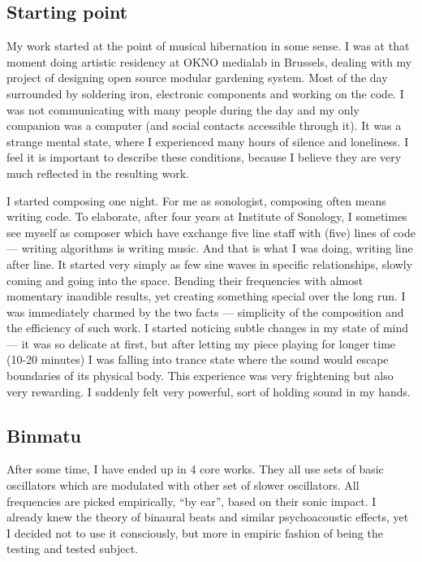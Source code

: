 \documentclass[12pt,a4paper,oneside]{report}
\begin{document}
\subsection{Starting point} My work started at the point of musical hibernation in some sense. I was at that moment doing artistic residency at OKNO medialab in Brussels, dealing with my project of designing open source modular gardening system. Most of the day surrounded by soldering iron, electronic components and working on the code. I was not communicating with many people during the day and my only companion was a computer (and social contacts accessible through it). It was a strange mental state, where I experienced many hours of silence and loneliness. I feel it is important to describe these conditions, because I believe they are very much reflected in the resulting work. 

I started composing one night. For me as sonologist, composing often means writing code. To elaborate, after four years at Institute of Sonology, I sometimes see myself as composer which have exchange five line staff with (five) lines of code --- writing algorithms is writing music. And that is what I was doing, writing line after line. It started very simply as few sine waves in specific relationships, slowly coming and going into the space. Bending their frequencies with almost momentary inaudible results, yet creating something special over the long run. I was immediately charmed by the two facts --- simplicity of the composition and the efficiency of such work. I started noticing subtle changes in my state of mind --- it was so delicate at first, but after letting my piece playing for longer time (10-20 minutes) I was falling into trance state where the sound would escape boundaries of its physical body. This experience was very frightening but also very rewarding. I suddenly felt very powerful, sort of holding sound in my hands. 

\subsection{Binmatu} After some time, I have ended up in 4 core works. They all use sets of basic oscillators which are modulated with other set of slower oscillators. All frequencies are picked empirically, ``by ear'', based on their sonic impact. I already knew the theory of binaural beats and similar psychoacoustic effects, yet I decided not to use it consciously, but more in empiric fashion of being the testing and tested subject.
\end{document}
